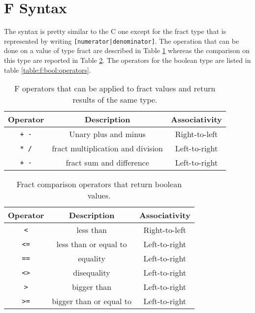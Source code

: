 \section{F Syntax}
The syntax is pretty similar to the C one except for the fract type that
is represented by writing \verb![numerator|denominator]!.
The operation that can be done on a value of type fract are described in Table
\ref{table:f:fract:operators} whereas the comparison on this type are reported
in Table \ref{table:f:fract:comparison:operators}.
The operators for the boolean type are listed in table 
\ref{table:f:bool:operators}.





\begin{table}[h]
\centering
\begin{tabular}{|c|c|c|}
\hline
\textbf{Operator} & \textbf{Description} & \textbf{Associativity} \\ 
\hline
\verb|+ -| & Unary plus and minus 	& Right-to-left	\\
\verb|* /| & fract multiplication and division & Left-to-right \\ 
\verb|+ -| & fract sum and difference & Left-to-right \\
\hline
\end{tabular}
\label{table:f:fract:operators}
\caption{F operators that can be applied to fract values and return results
of the same type.}

\end{table}

\begin{table}[h]
\centering
\begin{tabular}{|c|c|c|}
\hline
\textbf{Operator} & \textbf{Description} & \textbf{Associativity} \\ 
\hline
\verb|<|	& less than	& Right-to-left	\\
\verb|<=|	& less than or equal to	& Left-to-right \\ 
\verb|==|	& equality & Left-to-right \\
\verb|<>|	& disequality & Left-to-right \\
\verb|>|	& bigger than & Left-to-right\\
\verb|>=|	& bigger than or equal to & Left-to-right \\
\hline
\end{tabular}
\caption{Fract comparison operators that return boolean values.}
\label{table:f:fract:comparison:operators}
\end{table}


